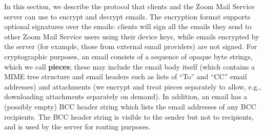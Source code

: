 In this section, we describe the protocol that clients and the Zoom Mail Service server can use to
encrypt and decrypt emails. The encryption format supports optional signatures over the emails:
clients will sign all the emails they send to other Zoom Mail Service users using their device keys,
while emails encrypted by the server (for example, those from external email providers) are not
signed. For cryptographic purposes, an email consists of a sequence of opaque byte strings, which we
call \textbf{pieces}; these may include the email body itself (which contains a MIME tree structure
and email headers such as lists of ``To'' and ``CC'' email addresses) and attachments (we encrypt
and treat pieces separately to allow, e.g., downloading attachments separately on demand). In
addition, an email has a (possibly empty) BCC header string which lists the email addresses of any
BCC recipients. The BCC header string is visible to the sender but not to recipients, and is used by
the server for routing purposes.

